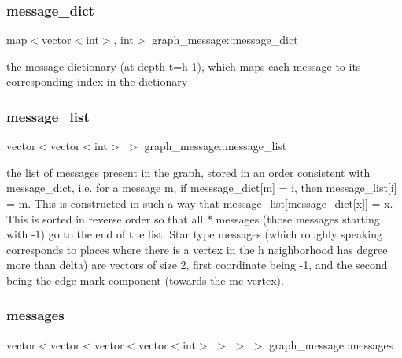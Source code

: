 \subsubsection{\texorpdfstring{message\+\_\+dict}{message\_dict}}
{\footnotesize\ttfamily map$<$vector$<$int$>$, int$>$ graph\+\_\+message\+::message\+\_\+dict}



the message dictionary (at depth t=h-\/1), which maps each message to its corresponding index in the dictionary 

\mbox{\label{classgraph__message_aa497f561e976cf58cc554a77e0601d8f}} 
\subsubsection{\texorpdfstring{message\+\_\+list}{message\_list}}
{\footnotesize\ttfamily vector$<$vector$<$int$>$ $>$ graph\+\_\+message\+::message\+\_\+list}



the list of messages present in the graph, stored in an order consistent with message\+\_\+dict, i.\+e. for a message m, if messsage\+\_\+dict\mbox{[}m\mbox{]} = i, then message\+\_\+list\mbox{[}i\mbox{]} = m. This is constructed in such a way that message\+\_\+list\mbox{[}message\+\_\+dict\mbox{[}x\mbox{]}\mbox{]} = x. This is sorted in reverse order so that all $\ast$ messages (those messages starting with -\/1) go to the end of the list. Star type messages (which roughly speaking corresponds to places where there is a vertex in the h neighborhood has degree more than delta) are vectors of size 2, first coordinate being -\/1, and the second being the edge mark component (towards the \textquotesingle{}me\textquotesingle{} vertex). 

\mbox{\label{classgraph__message_a06a1d1ab91b4891c65ea80205566f800}} 
\subsubsection{\texorpdfstring{messages}{messages}}
{\footnotesize\ttfamily vector$<$vector$<$vector$<$vector$<$int$>$ $>$ $>$ $>$ graph\+\_\+message\+::messages}



